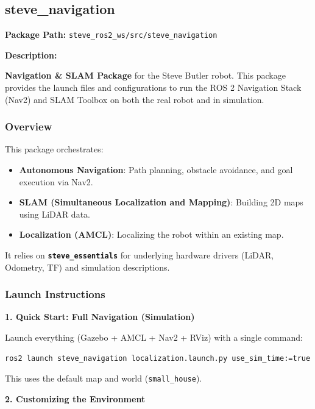\documentclass[12pt,oneside,a4paper]{article}
\begin{document}
\subsection{steve\_navigation}
\label{subsec:steve_navigation}

\textbf{Package Path:} \texttt{steve\_ros2\_ws/src/steve\_navigation}

\textbf{Description:}

\textbf{Navigation \& SLAM Package} for the Steve Butler robot. This package provides the launch files and configurations to run the ROS 2 Navigation Stack (Nav2) and SLAM Toolbox on both the real robot and in simulation.

\subsubsection{Overview}

This package orchestrates:
\begin{itemize}
    \item \textbf{Autonomous Navigation}: Path planning, obstacle avoidance, and goal execution via Nav2.
    \item \textbf{SLAM (Simultaneous Localization and Mapping)}: Building 2D maps using LiDAR data.
    \item \textbf{Localization (AMCL)}: Localizing the robot within an existing map.
\end{itemize}

It relies on \textbf{\texttt{steve\_essentials}} for underlying hardware drivers (LiDAR, Odometry, TF) and simulation descriptions.

\subsubsection{Launch Instructions}

\textbf{1. Quick Start: Full Navigation (Simulation)}

Launch everything (Gazebo + AMCL + Nav2 + RViz) with a single command:
\begin{lstlisting}[style=bashstyle]
ros2 launch steve_navigation localization.launch.py use_sim_time:=true
\end{lstlisting}
This uses the default map and world (\texttt{small\_house}).

\textbf{2. Customizing the Environment}
\end{document}
